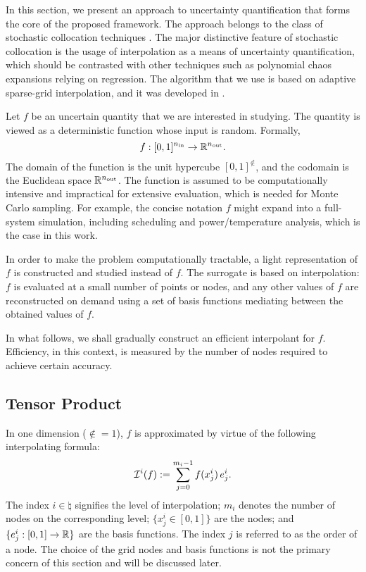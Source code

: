 In this section, we present an approach to uncertainty quantification that forms
the core of the proposed framework. The approach belongs to the class of
stochastic collocation techniques \cite{xiu2010}. The major distinctive feature
of stochastic collocation is the usage of interpolation as a means of
uncertainty quantification, which should be contrasted with other techniques
such as polynomial chaos expansions relying on regression. The algorithm that we
use is based on adaptive sparse-grid interpolation, and it was developed in
\cite{ma2009}.

Let $f$ be an uncertain quantity that we are interested in studying. The
quantity is viewed as a deterministic function whose input is random. Formally,
\[
  f: [0, 1]^{n_\text{in}} \to \mathbb{R}^{n_\text{out}}.
\]
The domain of the function is the unit hypercube $[0, 1]^\nin$, and the codomain
is the Euclidean space $\mathbb{R}^{n_\text{out}}$. The function is assumed to be
computationally intensive and impractical for extensive evaluation, which is
needed for Monte Carlo sampling. For example, the concise notation $f$ might
expand into a full-system simulation, including scheduling and power/temperature
analysis, which is the case in this work.

In order to make the problem computationally tractable, a light representation
of $f$ is constructed and studied instead of $f$. The surrogate is based on
interpolation: $f$ is evaluated at a small number of points or nodes, and any
other values of $f$ are reconstructed on demand using a set of basis functions
mediating between the obtained values of $f$.

In what follows, we shall gradually construct an efficient interpolant for $f$.
Efficiency, in this context, is measured by the number of nodes required to
achieve certain accuracy.

\subsection{Tensor Product}
In one dimension ($\nin = 1$), $f$ is approximated by virtue of the following
interpolating formula:
\[
  \mathcal{I}^{i}(f) := \sum_{j = 0}^{m_i - 1} f(x^i_j) \, e^i_j.
\]
The index $i \in \natural$ signifies the level of interpolation; $m_i$ denotes
the number of nodes on the corresponding level; $\{ x^i_j \in [0, 1] \}$ are the
nodes; and $\{ e^i_j: [0, 1] \to \mathbb{R} \}$ are the basis functions. The index
$j$ is referred to as the order of a node. The choice of the grid nodes and
basis functions is not the primary concern of this section and will be discussed
later.

